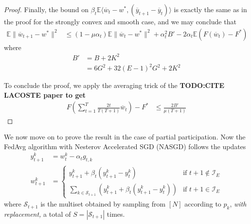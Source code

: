 \begin{proof}
	Finally, the bound on $\beta_{t}\mathbb{E}\langle\overline{w}_{t}-w^{\ast},(\overline{y}_{t+1}-\overline{y}_{t})\rangle$
	is exactly the same as in the proof for the strongly convex and smooth
	case, and we may conclude that 
	\begin{align*}
	\mathbb{E}\|\overline{w}_{t+1}-w^{\ast}\|^{2} & \leq(1-\mu\alpha_{t})\mathbb{E}\|\overline{w}_{t}-w^{\ast}\|^{2}+\alpha_{t}^{2}B'-2\alpha_{t}\mathbb{E}(F(\overline{w}_{t})-F^{\ast})
	\end{align*}
	where 
	\begin{align*}
	B' & =B+2K^{2}\\
	& =6G^{2}+32(E-1)^{2}G^{2}+2K^{2}
	\end{align*}
	
	To conclude the proof, we apply the averaging trick of the \textbf{TODO:CITE
		LACOSTE paper to get 
		\begin{align*}
		F(\sum_{t=1}^{T}\frac{2t}{T(T+1)}\overline{w}_{t})-F^{\ast} & \leq\frac{2B'}{\mu(T+1)}
		\end{align*}
	}
\end{proof}
%
We now move on to prove the result in the case of partial participation.
Now the FedAvg algorithm with Nesterov Accelerated SGD (NASGD) follows
the updates
\begin{align*}
y_{t+1}^{k} & =w_{t}^{k}-\alpha_{t}g_{t,k}\\
w_{t+1}^{k} & =\begin{cases}
y_{t+1}^{k}+\beta_{t}(y_{t+1}^{k}-y_{t}^{k}) & \text{if }t+1\notin\mathcal{I}_{E}\\
\sum_{k\in\mathcal{S}_{t+1}}\left(y_{t+1}^{k}+\beta_{t}(y_{t+1}^{k}-y_{t}^{k})\right) & \text{if }t+1\in\mathcal{I}_{E}
\end{cases}
\end{align*}
where $\mathcal{S}_{t+1}$ is the multiset obtained by sampling from
$[N]$ according to $p_{k}$, \emph{with replacement, }a total of
$S=|\mathcal{S}_{t+1}|$ times. 


